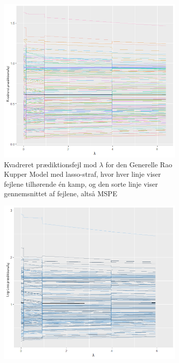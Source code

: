 \documentclass[11pt,a4paper]{article}
\begin{document}
\begin{figure}[htb!]
  \centering
  \begin{subfigure}[b]{0.4\textwidth}
        \includegraphics[width=\textwidth]{MSPESTATISK1.png}
    \caption{Kvadreret prædiktionsfejl mod $\lambda$ for den Generelle Rao Kupper Model med lasso-straf, hvor hver linje viser fejlene tilhørende én kamp, og den sorte linje viser gennemsnittet af fejlene, altså MSPE}
    \label{fig:MSPEStat}
  \end{subfigure}
  \hspace{0.2cm}
  \begin{subfigure}[b]{0.4\textwidth}
    \includegraphics[width=\textwidth]{LOGLOSSSTATISK1.png}

\end{subfigure}
\end{figure}
\end{document}
